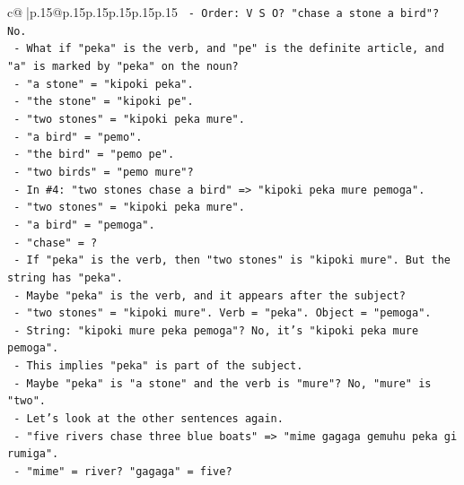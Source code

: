 \documentclass{article}
\begin{document}
{\begin{supertabular}{c@{$\;$}|p{.15\linewidth}@{}p{.15\linewidth}p{.15\linewidth}p{.15\linewidth}p{.15\linewidth}p{.15\linewidth}}
{{{\texttt{                          {-} Order: V S O? "chase a stone a bird"? No.} \\
\texttt{                        {-} What if "peka" is the verb, and "pe" is the definite article, and "a" is marked by "peka" on the noun?} \\
\texttt{                        {-} "a stone" = "kipoki peka".} \\
\texttt{                        {-} "the stone" = "kipoki pe".} \\
\texttt{                        {-} "two stones" = "kipoki peka mure".} \\
\texttt{                        {-} "a bird" = "pemo".} \\
\texttt{                        {-} "the bird" = "pemo pe".} \\
\texttt{                        {-} "two birds" = "pemo mure"?} \\
\texttt{                        {-} In \#4: "two stones chase a bird" => "kipoki peka mure pemoga".} \\
\texttt{                          {-} "two stones" = "kipoki peka mure".} \\
\texttt{                          {-} "a bird" = "pemoga".} \\
\texttt{                          {-} "chase" = ?} \\
\texttt{                          {-} If "peka" is the verb, then "two stones" is "kipoki mure". But the string has "peka".} \\
\texttt{                          {-} Maybe "peka" is the verb, and it appears after the subject?} \\
\texttt{                          {-} "two stones" = "kipoki mure". Verb = "peka". Object = "pemoga".} \\
\texttt{                          {-} String: "kipoki mure peka pemoga"? No, it's "kipoki peka mure pemoga".} \\
\texttt{                          {-} This implies "peka" is part of the subject.} \\
\texttt{                          {-} Maybe "peka" is "a stone" and the verb is "mure"? No, "mure" is "two".} \\
\texttt{                          {-} Let's look at the other sentences again.} \\
\texttt{                          {-} "five rivers chase three blue boats" => "mime gagaga gemuhu peka gi rumiga".} \\
\texttt{                            {-} "mime" = river? "gagaga" = five?} \\
}}}
\end{supertabular}}
\end{document}
